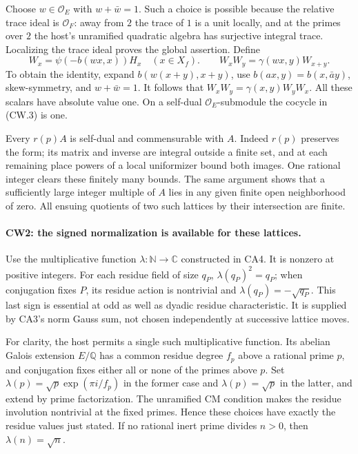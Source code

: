 Choose $w\in\mathcal O_E$ with $w+\bar w=1$.  Such a choice is possible
because the relative trace ideal is $\mathcal O_F$: away from $2$ the
trace of $1$ is a unit locally, and at the primes over $2$ the host's
unramified quadratic algebra has surjective integral trace.  Localizing
the trace ideal proves the global assertion.  Define
\[
 W_x=\psi(-b(wx,x))H_x\quad(x\in X_f).
 \qquad W_xW_y=\gamma(wx,y)W_{x+y}.                     \tag{CW.3}
\]
To obtain the identity, expand $b(w(x+y),x+y)$, use
$b(ax,y)=b(x,\bar a y)$, skew-symmetry, and $w+\bar w=1$.
It follows that $W_xW_y=\gamma(x,y)W_yW_x$.
All these scalars have absolute value one.  On a self-dual
$\mathcal O_E$-submodule the cocycle in (CW.3) is one.

Every $r(p)A$ is self-dual and commensurable with $A$.  Indeed $r(p)$
preserves the form; its matrix and inverse are integral outside a finite
set, and at each remaining place powers of a local uniformizer bound
both images.  One rational integer clears these finitely many bounds.
The same argument shows that a sufficiently large integer multiple of
$A$ lies in any given finite open neighborhood of zero.  All ensuing
quotients of two such lattices by their intersection are finite.

\paragraph{CW2: the signed normalization is available for these lattices.}
Use the multiplicative function $\lambda:\mathbb N\to\mathbb C$
constructed in CA4.  It is nonzero at positive integers.  For each
residue field of size $q_P$, $\lambda(q_P)^2=q_P$; when conjugation
fixes $P$, its residue action is nontrivial and
$\lambda(q_P)=-\sqrt{q_P}$.  This last sign is essential at odd as
well as dyadic residue characteristic.  It is supplied by CA3's norm
Gauss sum, not chosen independently at successive lattice moves.

For clarity, the host permits a single such multiplicative function.
Its abelian Galois extension $E/\mathbb Q$ has a common residue degree
$f_p$ above a rational prime $p$, and conjugation fixes either all or
none of the primes above $p$.  Set
$\lambda(p)=\sqrt p\exp(\pi i/f_p)$ in the former case and
$\lambda(p)=\sqrt p$ in the latter, and extend by prime factorization.
The unramified CM condition makes the residue involution nontrivial
at the fixed primes.  Hence these choices have exactly the residue
values just stated.  If no rational inert prime divides $n>0$, then
$\lambda(n)=\sqrt n$.

